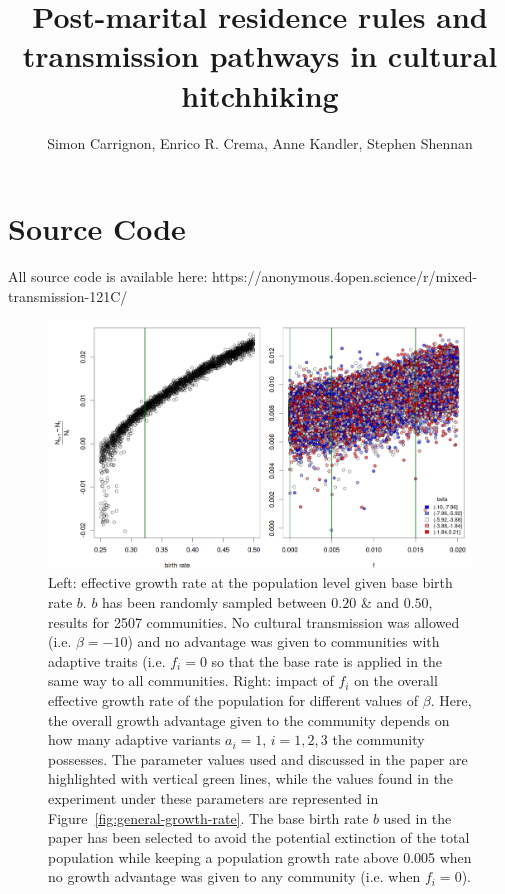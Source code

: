 \documentclass[9pt,twoside,lineno]{pnas-new}
\title{Post-marital residence rules and transmission pathways in cultural hitchhiking}
\author{Simon Carrignon, Enrico R. Crema, Anne Kandler, Stephen Shennan}
\begin{document}
\maketitle

\section*{Source Code}
All source code is available here:  https://anonymous.4open.science/r/mixed-transmission-121C/

\begin{figure} %
    \centering
    \includegraphics[width=.7\textwidth]{FigsSM/growth_rate_wrt_b_f.png}
    \caption{Left: effective growth rate at the population level given base birth rate $b$. $b$ has been randomly sampled between $0.20$ \& and $0.50$, results for 2507 communities. No cultural transmission was allowed (i.e. $\beta=-10$) and no advantage was given to communities with adaptive traits (i.e. $f_i=0$ so that the base rate is applied in the same way to all communities. Right: impact of $f_i$ on the overall effective growth rate of the population for different values of $\beta$. Here, the overall growth advantage given to the community depends on how many adaptive variants $a_i=1$, $i=1,2,3$ the community possesses.
    The parameter values used and discussed in the paper are highlighted with vertical green lines, while the values found in the experiment under these parameters are represented in Figure~\ref{fig:general-growth-rate}.
     The base birth rate $b$ used in the paper has been selected to avoid the potential extinction of the total population while keeping a population growth rate above 0.005 when no growth advantage was given to any community (i.e. when $f_i=0$).}
    \label{fig:f-wrt-growth-rate}
\end{figure}
\end{document}
